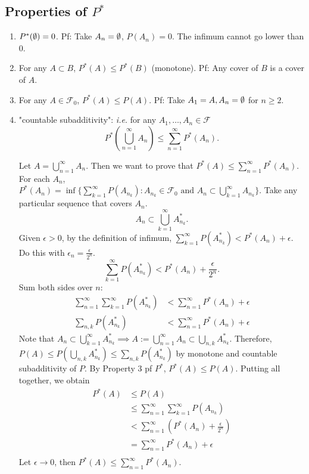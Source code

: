 \documentclass[class=article,crop=false]{standalone}
\begin{document}
\subsection{Properties of $P^* $}
\begin{enumerate}
	\item $P^* (\emptyset)=0$. Pf: Take $A_n=\emptyset$, $P(A_n)=0$. The infimum cannot go lower than 0.
	\item For any $A \subset  B$, $P^*(A) \leq P^* (B)$ (monotone). Pf: Any cover of $B$ is a cover of $A$.
	\item For any  $A \in \mathcal{F}_0$, $P^* (A) \leq P(A)$. Pf: Take $A_1=A, A_n=\emptyset$ for $n\geq 2$. 
	\item "countable subadditivity":  \emph{i.e.} for any $A_1,\ldots,A_n \in \mathcal{F}$ 
		\[
			P^* \left( \bigcup_{n= 1}^{\infty} A_n \right) \leq \sum_{ n=1}^{\infty} P^* (A_n)
		.\]
\begin{prf}
	Let $A=\bigcup_{n= 1}^{\infty} A_n$. Then we want to prove that $P^* (A) \leq \sum_{ n=1}^{\infty} P^* (A_n)$. 
	For each $A_n$, $P^* (A_n) = \inf\{ \sum_{ k=1}^{\infty} P(A_{n_k}): A_{n_k} \in \mathcal{F}_0 \text{ and } A_n \subset \bigcup_{k=1}^{\infty} A_{n_k} \}$. Take any particular sequence that covers $A_n$. 
	\[
		A_n \subset \bigcup_{k= 1}^{\infty} A_{n_k}^*  
	.\] 
	Given $\epsilon>0$, by the definition of infimum, $\sum_{ k=1}^{\infty} P(A_{n_k}^* ) < P^* (A_n)+ \epsilon$.
	Do this with $\epsilon_n=\frac{\epsilon}{2^{n}}$.
	\[
		\sum_{ k=1}^{\infty} P(A_{n_k}^* ) < P^* (A_n) + \frac{\epsilon}{2^{n}}
	.\] 
	Sum both sides over $n$:
	 \begin{align*}
		 \sum_{ n=1}^{\infty} \sum_{ k=1}^{\infty} P(A_{n_k}^*) &< \sum_{ n=1}^{\infty} P^* (A_n) + \epsilon \\
		 \sum_{n,k} P(A_{n_k}^* ) &< \sum_{ n=1}^{\infty} P^*(A_n) +\epsilon
	\end{align*}
	Note that $A_n \subset \bigcup_{k= 1}^{\infty} A_{n_k}^*  \implies A := \bigcup_{n= 1}^{\infty} A_n \subset \bigcup_{n,k} A_{n_k}^*$. Therefore, $ P(A) \leq P\left(\bigcup_{n,k} A_{n_k}^*\right) \leq \sum_{n,k} P(A_{n_k}^* )$ by monotone and countable subadditivity of $P$. 
	By Property 3 pf $P^*$, $P^*(A) \leq P(A)$. Putting all together, we obtain
\begin{align*}
	P^*(A) &\leq P(A)  \\
	       &\leq \sum_{ n=1}^{\infty} \sum_{ k=1}^{\infty} P(A_{n_k})  \\
	       &< \sum_{ n=1}^{\infty} \left( P^*(A_n) + \frac{\epsilon}{2^{n}}\right) \\
	       &= \sum_{ n=1}^{\infty} P^*(A_n) + \epsilon\\
\end{align*}
Let $\epsilon \to 0$, then $P^* (A) \leq \sum_{ n=1}^{\infty} P^*(A_n)$.
\end{prf}
\end{enumerate}
\end{document}
